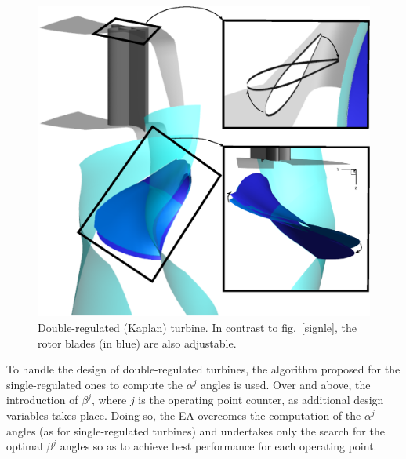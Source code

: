 \begin{figure}[h!]
\centering
\includegraphics[width=.8\textwidth]{DOUBLE.eps}
\caption{Double-regulated (Kaplan) turbine. In contrast to fig.\ \ref{signle}, the rotor blades (in blue) are also adjustable.}
\label{double}
\end{figure}

To handle the design of double-regulated turbines, the algorithm proposed for the single-regulated ones to compute the $\alpha^j$ angles is used. Over and above, the introduction of $\beta^j$, where $j$ is the operating point counter, as additional design variables takes place. Doing so, the EA overcomes the computation of the $\alpha^j$ angles (as for single-regulated turbines) and undertakes only the search for the optimal $\beta^j$ angles so as to achieve best performance for each operating point. %




 







